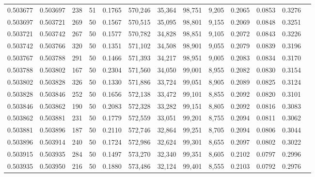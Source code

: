 \begin{tabular}{rrrrrrrrrrrrr}
0.503677 & 0.503697 & 238 &  51 &                                     0.1765 & 570,246 &  35,364 &  98,751 &   9,205 & 0.2065 & 0.0853 & 0.3276 \\
0.503697 & 0.503721 & 269 &  50 &                                     0.1567 & 570,515 &  35,095 &  98,801 &   9,155 & 0.2069 & 0.0848 & 0.3251 \\
0.503721 & 0.503742 & 267 &  50 &                                     0.1577 & 570,782 &  34,828 &  98,851 &   9,105 & 0.2072 & 0.0843 & 0.3226 \\
0.503742 & 0.503766 & 320 &  50 &                                     0.1351 & 571,102 &  34,508 &  98,901 &   9,055 & 0.2079 & 0.0839 & 0.3196 \\
0.503767 & 0.503788 & 291 &  50 &                                     0.1466 & 571,393 &  34,217 &  98,951 &   9,005 & 0.2083 & 0.0834 & 0.3170 \\
0.503788 & 0.503802 & 167 &  50 &                                     0.2304 & 571,560 &  34,050 &  99,001 &   8,955 & 0.2082 & 0.0830 & 0.3154 \\
0.503802 & 0.503828 & 326 &  50 &                                     0.1330 & 571,886 &  33,724 &  99,051 &   8,905 & 0.2089 & 0.0825 & 0.3124 \\
0.503828 & 0.503846 & 252 &  50 &                                     0.1656 & 572,138 &  33,472 &  99,101 &   8,855 & 0.2092 & 0.0820 & 0.3101 \\
0.503846 & 0.503862 & 190 &  50 &                                     0.2083 & 572,328 &  33,282 &  99,151 &   8,805 & 0.2092 & 0.0816 & 0.3083 \\
0.503862 & 0.503881 & 231 &  50 &                                     0.1779 & 572,559 &  33,051 &  99,201 &   8,755 & 0.2094 & 0.0811 & 0.3062 \\
0.503881 & 0.503896 & 187 &  50 &                                     0.2110 & 572,746 &  32,864 &  99,251 &   8,705 & 0.2094 & 0.0806 & 0.3044 \\
0.503896 & 0.503914 & 240 &  50 &                                     0.1724 & 572,986 &  32,624 &  99,301 &   8,655 & 0.2097 & 0.0802 & 0.3022 \\
0.503915 & 0.503935 & 284 &  50 &                                     0.1497 & 573,270 &  32,340 &  99,351 &   8,605 & 0.2102 & 0.0797 & 0.2996 \\
0.503935 & 0.503950 & 216 &  50 &                                     0.1880 & 573,486 &  32,124 &  99,401 &   8,555 & 0.2103 & 0.0792 & 0.2976 \\

\end{tabular}
